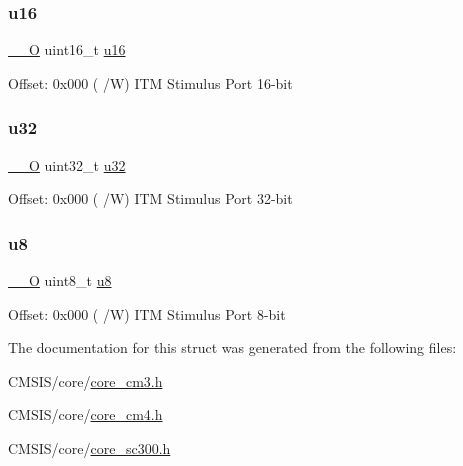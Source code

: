 \subsubsection{\texorpdfstring{u16}{u16}}
{\footnotesize\ttfamily \mbox{\hyperlink{core__sc300_8h_a7e25d9380f9ef903923964322e71f2f6}{\+\_\+\+\_\+O}} uint16\+\_\+t \mbox{\hyperlink{group___exported__types_gace9d960e74685e2cd84b36132dbbf8aa}{u16}}}

Offset\+: 0x000 ( /W) I\+TM Stimulus Port 16-\/bit \mbox{\label{struct_i_t_m___type_acaf6d0e14a3d4b541c624913b4a1931e}} 
\subsubsection{\texorpdfstring{u32}{u32}}
{\footnotesize\ttfamily \mbox{\hyperlink{core__sc300_8h_a7e25d9380f9ef903923964322e71f2f6}{\+\_\+\+\_\+O}} uint32\+\_\+t \mbox{\hyperlink{group___exported__types_gafaa62991928fb9fb18ff0db62a040aba}{u32}}}

Offset\+: 0x000 ( /W) I\+TM Stimulus Port 32-\/bit \mbox{\label{struct_i_t_m___type_a0374c0b98ab9de6f71fabff7412df832}} 
\subsubsection{\texorpdfstring{u8}{u8}}
{\footnotesize\ttfamily \mbox{\hyperlink{core__sc300_8h_a7e25d9380f9ef903923964322e71f2f6}{\+\_\+\+\_\+O}} uint8\+\_\+t \mbox{\hyperlink{group___exported__types_ga92c50087ca0e64fa93fc59402c55f8ca}{u8}}}

Offset\+: 0x000 ( /W) I\+TM Stimulus Port 8-\/bit 

The documentation for this struct was generated from the following files\+:\begin{DoxyCompactItemize}
\item 
C\+M\+S\+I\+S/core/\mbox{\hyperlink{core__cm3_8h}{core\+\_\+cm3.\+h}}\item 
C\+M\+S\+I\+S/core/\mbox{\hyperlink{core__cm4_8h}{core\+\_\+cm4.\+h}}\item 
C\+M\+S\+I\+S/core/\mbox{\hyperlink{core__sc300_8h}{core\+\_\+sc300.\+h}}\end{DoxyCompactItemize}
